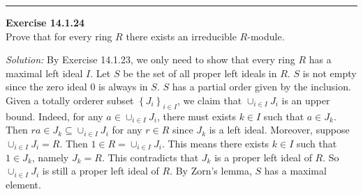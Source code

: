 \documentclass[a4paper, 12pt]{article}
\newenvironment{problem}[2][Exercise]
    { \begin{mdframed}[backgroundcolor=gray!20] \textbf{#1 #2} \\}
    {  \end{mdframed}}
\newenvironment{solution}
    {\textit{Solution:}}
    {}
\begin{document}
\noindent\rule{7in}{2.8pt}
\begin{problem}{14.1.24}
Prove that for every ring \(R\) there exists an irreducible \(R\)-module.
\end{problem}
\begin{solution}
By Exercise 14.1.23, we only need to show that every ring \(R\) has a maximal left ideal \(I\). Let \(S\) be the set of all proper left ideals in \(R\). \(S\) is not empty since the zero ideal \(0\) is always in \(S\). \(S\) has a partial order given by the inclusion. Given a totally orderer subset 
\(\left\{ J_i \right\}_{i\in I}\), we claim that \(\cup_{i\in I}J_i\) is an upper bound. Indeed, for any \(a\in \cup_{i\in I}J_i\), there must exists \(k\in I\) such that \(a\in J_k\). Then \(ra\in J_k\subseteq \cup_{i\in I}J_i\) for any \(r\in R\) since \(J_k\) is a left ideal. Moreover, suppose \(\cup_{i\in I}J_i=R\). Then 
\(1\in R=\cup_{i\in I}J_i\). This means there exists \(k\in I\) such that \(1\in J_k\), namely \(J_k=R\). This contradicts that \(J_k\) is a proper left ideal of \(R\). So \(\cup_{i\in I}J_i\) is still a proper left ideal of \(R\). By Zorn's lemma, \(S\) has a maximal element.
\end{solution}
\end{document}
